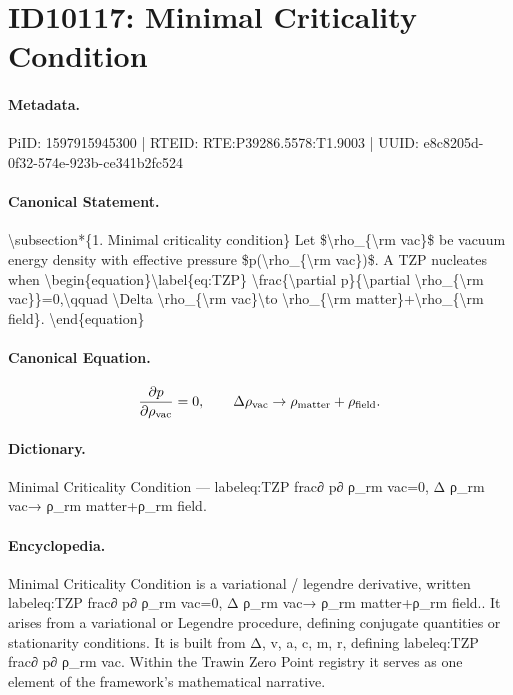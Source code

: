 \section*{ID10117: Minimal Criticality Condition}
\paragraph{Metadata.}
PiID: 1597915945300 | RTEID: RTE:P39286.5578:T1.9003 | UUID: e8c8205d-0f32-574e-923b-ce341b2fc524

\paragraph{Canonical Statement.}
\textbackslash{}subsection*\{1. Minimal criticality condition\} Let \$\textbackslash{}rho\_\{\textbackslash{}rm vac\}\$ be vacuum energy density with effective pressure \$p(\textbackslash{}rho\_\{\textbackslash{}rm vac\})\$. A TZP nucleates when \textbackslash{}begin\{equation\}\textbackslash{}label\{eq:TZP\} \textbackslash{}frac\{\textbackslash{}partial p\}\{\textbackslash{}partial \textbackslash{}rho\_\{\textbackslash{}rm vac\}\}=0,\textbackslash{}qquad \textbackslash{}Delta \textbackslash{}rho\_\{\textbackslash{}rm vac\}\textbackslash{}to \textbackslash{}rho\_\{\textbackslash{}rm matter\}+\textbackslash{}rho\_\{\textbackslash{}rm field\}. \textbackslash{}end\{equation\}

\paragraph{Canonical Equation.}
\[
\label{eq:TZP} \frac{\partial p}{\partial \rho_{\rm vac}}=0,\qquad \Delta \rho_{\rm vac}\to \rho_{\rm matter}+\rho_{\rm field}.
\]

\paragraph{Dictionary.}
Minimal Criticality Condition — labeleq:TZP frac∂ p∂ ρ\_rm vac=0, Δ ρ\_rm vac→ ρ\_rm matter+ρ\_rm field.

\paragraph{Encyclopedia.}
Minimal Criticality Condition is a variational / legendre derivative, written labeleq:TZP frac∂ p∂ ρ\_rm vac=0, Δ ρ\_rm vac→ ρ\_rm matter+ρ\_rm field.. It arises from a variational or Legendre procedure, defining conjugate quantities or stationarity conditions. It is built from Δ, v, a, c, m, r, defining labeleq:TZP frac∂ p∂ ρ\_rm vac. Within the Trawin Zero Point registry it serves as one element of the framework's mathematical narrative.
